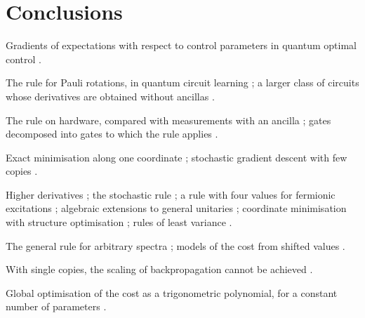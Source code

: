 \documentclass[handoutsbeamer.tex]{subfiles}
\begin{document}
\section{Conclusions}

\begin{frame}
\onp{\scriptsize}
\begin{description}\setlength\itemsep{0.1em}
    \item[2005, 2017] Gradients of expectations with respect to control parameters in quantum optimal control \citep{Khaneja2005,Li_2017}.
    \item[2018] The rule for Pauli rotations, in quantum circuit learning \citep{Mitarai_2018}; a larger class of circuits whose derivatives are obtained without ancillas \citep{Theis2018}.
    \item[2019] The rule on hardware, compared with measurements with an ancilla \citep{schuld2019evaluating}; gates decomposed into gates to which the rule applies \citep{Crooks2019}.
    \item[2020] Exact minimisation along one coordinate \citep{nakanishi2020sequential}; stochastic gradient descent with few copies \citep{sweke2020stochastic}.
    \item[2021] Higher derivatives \citep{Mari_2021}; the stochastic rule \citep{Banchi_2021}; a rule with four values for fermionic excitations \citep{Kottmann2021}; algebraic extensions to general unitaries \citep{izmaylov2021analytic}; coordinate minimisation with structure optimisation \citep{ostaszewski2021structure}; rules of least variance \citep{Theis2021}.
    \item[2022] The general rule for arbitrary spectra \citep{Wierichs2021}; models of the cost from shifted values \citep{koczor2022quantum}.
    \item[2023] With single copies, the scaling of backpropagation cannot be achieved \citep{abbas2023backpropagation}.
    \item[2026] Global optimisation of the cost as a trigonometric polynomial, for a constant number of parameters \citep{sakos2026global}.
\end{description}
\end{frame}
\end{document}
